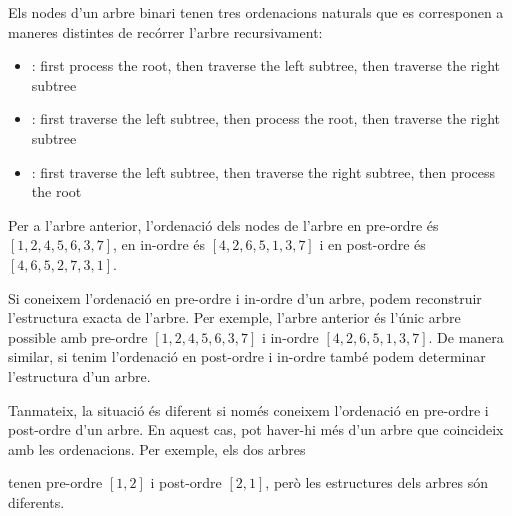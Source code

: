 Els nodes d'un arbre binari tenen tres ordenacions naturals que es
corresponen a maneres distintes de recórrer l'arbre recursivament:


\begin{itemize}
\item {}: first process the root,
then traverse the left subtree, then traverse the right subtree
\item {}: first traverse the left subtree,
then process the root, then traverse the right subtree
\item {}: first traverse the left subtree,
then traverse the right subtree, then process the root
\end{itemize}


Per a l'arbre anterior, l'ordenació dels nodes de l'arbre en pre-ordre
és $[1,2,4,5,6,3,7]$, en in-ordre és $[4,2,6,5,1,3,7] $ i en
post-ordre és $[4,6,5,2,7,3,1]$.

Si coneixem l'ordenació en pre-ordre i in-ordre d'un arbre, podem
reconstruir l'estructura exacta de l'arbre. Per exemple, l'arbre
anterior és l'únic arbre possible amb pre-ordre $[1,2,4,5,6,3,7]$ i
in-ordre $[4,2,6,5,1,3, 7]$. De manera similar, si tenim l'ordenació
en post-ordre i in-ordre també podem determinar l'estructura d'un
arbre.

Tanmateix, la situació és diferent si només coneixem l'ordenació en
pre-ordre i post-ordre d'un arbre. En aquest cas, pot haver-hi més
d'un arbre que coincideix amb les ordenacions. Per exemple, els dos
arbres
\begin{center}
\end{center}
tenen pre-ordre $[1,2]$ i post-ordre $[2,1]$, però les estructures
dels arbres són diferents.



